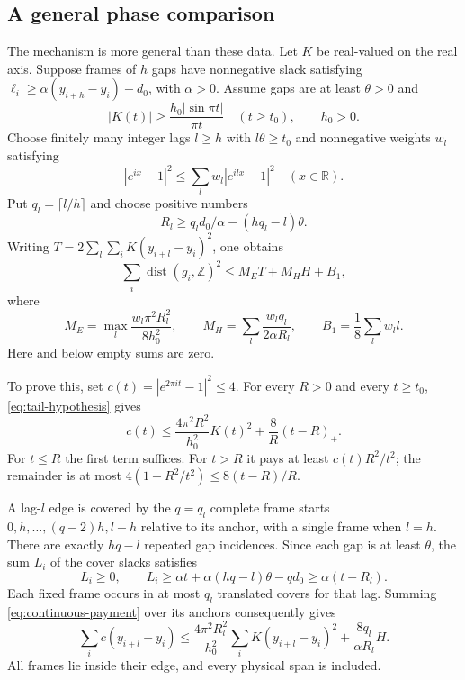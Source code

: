 \documentclass[11pt,reqno]{amsart}
\numberwithin{equation}{section}
\newcommand{\R}{\mathbb R}
\newcommand{\Z}{\mathbb Z}
\newcommand{\dist}{\operatorname{dist}}
\begin{document}
\subsection{A general phase comparison}

The mechanism is more general than these data. Let $K$ be real-valued
on the real axis. Suppose frames of $h$
gaps have nonnegative slack satisfying
$\ell_i\ge\alpha(y_{i+h}-y_i)-d_0$, with $\alpha>0$.
Assume gaps are at least $\theta>0$ and
\begin{equation}
 |K(t)|\ge\frac{h_0|\sin\pi t|}{\pi t}\quad(t\ge t_0),
 \qquad h_0>0.
 \label{eq:tail-hypothesis}
\end{equation}
Choose finitely many integer lags $l\ge h$ with $l\theta\ge t_0$
and nonnegative weights $w_l$ satisfying
\begin{equation}
 |e^{ix}-1|^2\le\sum_lw_l|e^{ilx}-1|^2\quad(x\in\R).
 \label{eq:phase-comparison}
\end{equation}
Put $q_l=\lceil l/h\rceil$ and choose positive numbers
\begin{equation}
 R_l\ge q_ld_0/\alpha-(hq_l-l)\theta.
 \label{eq:cover-radius}
\end{equation}
Writing $T=2\sum_l\sum_i K(y_{i+l}-y_i)^2$, one obtains
\begin{equation}
 \sum_i\dist(g_i,\Z)^2\le M_ET+M_HH+B_1,
 \label{eq:general-rigidity}
\end{equation}
where
\begin{equation}
 M_E=\max_l\frac{w_l\pi^2R_l^2}{8h_0^2},\qquad
 M_H=\sum_l\frac{w_lq_l}{2\alpha R_l},\qquad
 B_1=\frac18\sum_lw_ll.
 \label{eq:prices}
\end{equation}
Here and below empty sums are zero.

To prove this, set $c(t)=|e^{2\pi it}-1|^2\le4$.
For every $R>0$ and every $t\ge t_0$, \eqref{eq:tail-hypothesis} gives
\begin{equation}
 c(t)\le\frac{4\pi^2R^2}{h_0^2}K(t)^2+
 \frac8R(t-R)_+.
 \label{eq:continuous-payment}
\end{equation}
For $t\le R$ the first term suffices. For $t>R$ it pays at least
$c(t)R^2/t^2$; the remainder is at most
$4(1-R^2/t^2)\le8(t-R)/R$.

A lag-$l$ edge is covered by the $q=q_l$ complete frame starts
$0,h,\ldots,(q-2)h,l-h$ relative to its anchor, with a single frame
when $l=h$. There are exactly $hq-l$ repeated gap incidences.
Since each gap is at least $\theta$, the sum $L_i$ of the cover slacks
satisfies
\[
 L_i\ge0,\qquad
 L_i\ge\alpha t+\alpha(hq-l)\theta-qd_0
 \ge\alpha(t-R_l).
\]
Each fixed frame occurs in at most $q_l$ translated covers for that lag.
Summing \eqref{eq:continuous-payment} over its anchors consequently gives
\begin{equation}
 \sum_i c(y_{i+l}-y_i)
 \le\frac{4\pi^2R_l^2}{h_0^2}\sum_iK(y_{i+l}-y_i)^2
 +\frac{8q_l}{\alpha R_l}H.
 \label{eq:covered-chords}
\end{equation}
All frames lie inside their edge, and every physical span is included.
\end{document}
